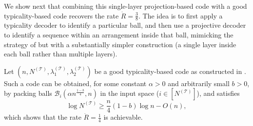 \documentclass[10pt,conference]{IEEEtran}
\newcommand{\1}{\mathds{1}}
\newcommand{\cB}{\mathcal{B}}
\newcommand{\cT}{\mathcal{T}}
\begin{document}
\medskip
We show next that combining this single-layer projection-based code with a good typicality-based code recovers the rate $\dot R=\frac38$. The idea is to first apply a typicality decoder to identify a particular ball, and then use a projective decoder to identify a sequence within an arrangement inside that ball, mimicking the strategy of \cite{galaxy-codes} but with a substantially simpler construction (a single layer inside each ball rather than multiple layers).

Let $(n,N^{(\cT)},\lambda_1^{(\cT)},\lambda_2^{(\cT)})$ be a good typicality-based code as constructed in \cite{DI-fading}. Such a code can be obtained, for some constant $\alpha>0$ and arbitrarily small $b>0$, by packing balls $\cB_{i}(\alpha n^{\frac{1-b}{4}},n)$ in the input space ($i\in[N^{(\cT)}]$), and satisfies 
\begin{equation}\label{eq:typical_size}
    \log N^{(\cT)}\geq\frac{n}{4}(1-b)\log n-O(n),
\end{equation}
which shows that the rate $\dot R=\frac{1}{4}$ is achievable.
\end{document}
